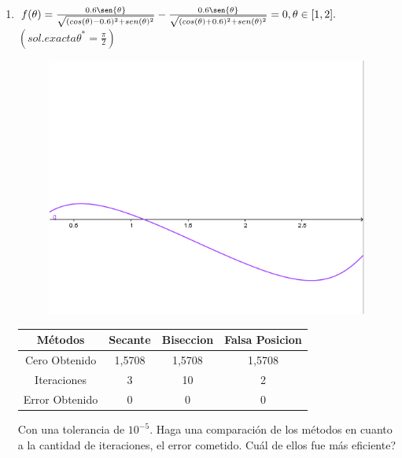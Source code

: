 \documentclass{udparticle}
\begin{document}
\begin{enumerate}
\begin{enumerate}
\begin{table}[H]
\begin{tabular} { |c|c|c|c|}
        \end{tabular}
    \end{table}

\item $ f (\theta) = \frac{0.6\sen{\theta}}{\sqrt{(cos(\theta) - 0.6)^2 + sen(\theta)^2}} -  \frac{0.6\sen{\theta}}{\sqrt{(cos(\theta) + 0.6)^2 + sen(\theta)^2}} = 0, \theta \in [1,2].$
$(sol. exacta \theta^* = \frac{\pi}{2})$

    \begin{figure}[H]
    \centering
    \includegraphics[width=11cm]{GraficoEj1e}
    \end{figure}

    \begin{table}[H]
    \centering
        \begin{tabular} { |c|c|c|c|}
        
        \hline
        Métodos       & Secante & Biseccion & Falsa Posicion \\
        \hline
        Cero Obtenido &  1,5708       &   1,5708       &      1,5708        \\
        \hline
        Iteraciones   &     3        &      10        &        2       \\
        \hline
        Error Obtenido  &   0        &      0      &          0  \\
        \hline
        
        \end{tabular}
    \end{table}
    
Con una tolerancia de $ 10^{-5} $. Haga una comparación de los métodos en cuanto a la cantidad de iteraciones, el error cometido. Cuál de ellos fue más eficiente?


\end{enumerate}
\end{enumerate}
\end{document}
